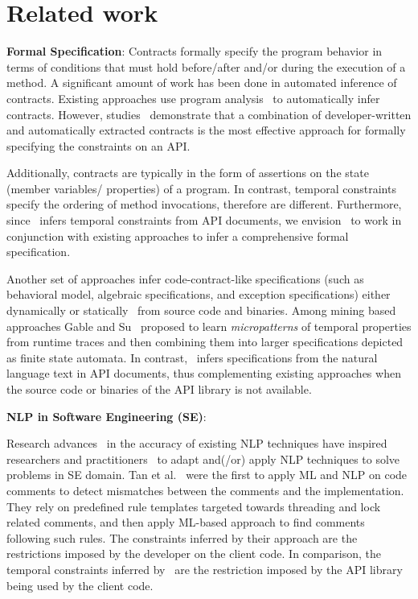 \section{Related work}
\label{sec:related}

\textbf{Formal Specification}:
Contracts formally specify the program behavior in terms of conditions that must hold before/after and/or during the execution of a method.
A significant amount of work has been done in automated inference of contracts.
Existing approaches use program analysis~\cite{csallner08dysy,NimmerE02:ISSTA,Tillmann:2006:DLM:2105385.2105433}
to automatically infer contracts.
However, studies~\cite{Polikarpova2009ISSTA,Flanagan2001:HAA} demonstrate that a combination of developer-written and automatically extracted
contracts is the most effective approach for formally specifying the constraints on an API.

Additionally, contracts are typically in the form of assertions on the state (member variables/ properties) of a program. In contrast, temporal constraints specify the ordering of method invocations, therefore are different.
Furthermore, since \tool\ infers temporal constraints from API documents, we envision \tool\ to work in conjunction with existing approaches
to infer a comprehensive formal specification.
 
Another set of approaches infer code-contract-like specifications (such as behavioral model, algebraic specifications, and exception specifications) either dynamically\cite{Henkel07discoveringdocumentation,Ghezzi:2009:SIB:1555001.1555057,Henkel:2008:DDA:1363102.1363105} or statically~\cite{Flanagan2001:HAA,Buse:2008:ADI:1390630.1390664} from source code and binaries. 
Among mining based approaches Gable and Su~\cite{gabel2008javert} proposed to learn  
\textit{micropatterns} of temporal properties from runtime traces and then combining them into larger specifications depicted as finite state automata.
In contrast, \tool\ infers specifications from the natural language text in API documents,
thus complementing existing approaches when the source code or binaries of the API library is not available.


\textbf{NLP in Software Engineering (SE)}:

Research advances~\cite{Marneffe08COLING,KleinNIPS03} in the accuracy of existing NLP techniques have inspired researchers and practitioners~\cite{pandita12:inferring, pandita13:WHYPER, johnSlankasPASSAT13, XiaoFSE2012, thummalapentaICSE12} to adapt and(/or) apply NLP techniques to solve problems in SE domain. 
Tan et al.~\cite{TanSOSP07} were the first to apply ML and NLP on code comments to detect mismatches between the comments and the implementation.
They rely on predefined rule templates targeted towards threading and lock related comments, and then apply ML-based approach to find comments following such rules.
The constraints inferred by their approach are the restrictions imposed by the developer on the client code.
In comparison, the temporal constraints inferred by \tool\ are the restriction imposed by the API library being used by the client code.

